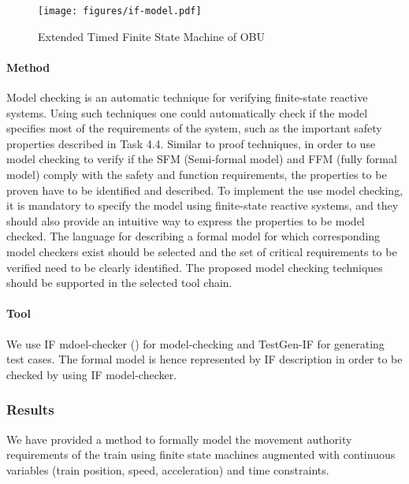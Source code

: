 \begin{figure}[!htbp]
\begin{center}
  \texttt{[image: figures/if-model.pdf]}
  \caption{Extended Timed Finite State Machine of OBU}
  \label{fig:model}
\end{center}
\end{figure}

\paragraph{Method}


Model checking is an automatic technique for verifying finite-state reactive
systems. Using such techniques one could automatically check if the model
specifies most of the requirements of the system, such as the important safety
properties described in Task 4.4. Similar to proof techniques, in order to use
model checking to verify if the SFM (Semi-formal model) and FFM (fully formal
model) comply with the safety and function requirements,
the properties to be proven have to be identified and described. To implement
the use model checking, it is mandatory to specify the model using finite-state
reactive systems, and they should also provide an intuitive way to express the
properties to be model checked. The language for describing a formal model for
which corresponding model checkers exist should be selected and the set of
critical requirements to be verified need to be clearly identified. The proposed
model checking techniques should be supported in the selected tool chain. 

\paragraph{Tool}
We use IF mdoel-checker () for model-checking and 
TestGen-IF for generating test cases.
The formal model is hence represented by IF description%
in order to be checked by using IF model-checker.


\subsubsection{Results}



We have provided a method to formally model the
movement authority requirements of the train using
finite state machines augmented with continuous variables (train position, speed, acceleration) and
time constraints. 

